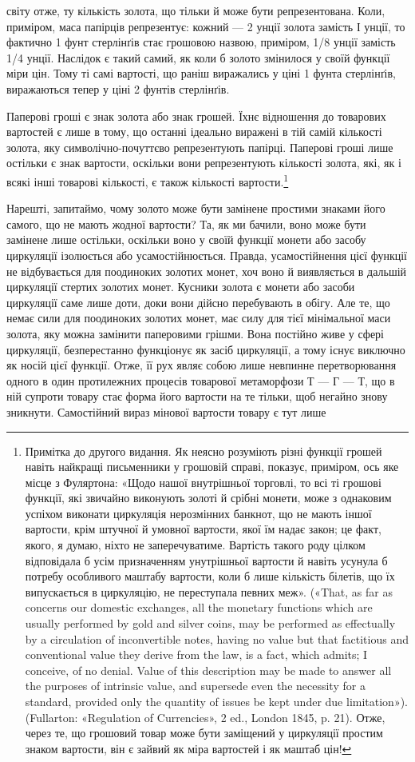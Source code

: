 світу отже, ту кількість золота, що тільки й може бути репрезентована.
Коли, приміром, маса папірців репрезентує: кожний —
2 унції золота замість І унції, то фактично 1 фунт стерлінґів
стає грошовою назвою, приміром, 1/8 унції замість 1/4 унції.
Наслідок є такий самий, як коли б золото змінилося у своїй
функції міри цін. Тому ті самі вартості, що раніш виражались
у ціні 1 фунта стерлінґів, виражаються тепер у ціні 2 фунтів
стерлінґів.

Паперові гроші є знак золота або знак грошей. Їхнє відношення
до товарових вартостей є лише в тому, що останні ідеально виражені
в тій самій кількості золота, яку символічно-почуттєво
репрезентують папірці. Паперові гроші лише остільки є знак
вартости, оскільки вони репрезентують кількості золота, які,
як і всякі інші товарові кількості, є також кількості вартости.\footnote{
Примітка до другого видання. Як неясно розуміють різні функції
грошей навіть найкращі письменники у грошовій справі, показує, приміром,
ось яке місце з Фуляртона: «Щодо нашої внутрішньої торговлі, то
всі ті грошові функції, які звичайно виконують золоті й срібні монети,
може з однаковим успіхом виконати циркуляція нерозмінних банкнот,
що не мають іншої вартости, крім штучної й умовної вартости, якої їм
надає закон; це факт, якого, я думаю, ніхто не заперечуватиме. Вартість
такого роду цілком відповідала б усім призначенням унутрішньої вартости
й навіть усунула б потребу особливого маштабу вартости, коли б лише
кількість білетів, що їх випускається в циркуляцію, не переступала
певних меж». («That, as far as concerns our domestic exchanges, all the
monetary functions which are usually performed by gold and silver coins,
may be performed as effectually by a circulation of inconvertible notes,
having no value but that factitious and conventional value they derive
from the law, is a fact, which admits; I conceive, of no denial. Value of
this description may be made to answer all the purposes of intrinsic value,
and supersede even the necessity for a standard, provided only the quantity
of issues be kept under due limitation»). (Fullarton: «Regulation of
Currencies», 2 ed., London 1845, p. 21). Отже, через те, що грошовий
товар може бути заміщений у циркуляції простим знаком вартости, він
є зайвий як міра вартостей і як маштаб цін!
}

Нарешті, запитаймо, чому золото може бути замінене простими
знаками його самого, що не мають жодної вартости? Та, як ми
бачили, воно може бути замінене лише остільки, оскільки воно
у своїй функції монети або засобу циркуляції ізолюється або
усамостійнюється. Правда, усамостійнення цієї функції не відбувається
для поодиноких золотих монет, хоч воно й виявляється
в дальшій циркуляції стертих золотих монет. Кусники золота
є монети або засоби циркуляції саме лише доти, доки вони дійсно
перебувають в обігу. Але те, що немає сили для поодиноких золотих
монет, має силу для тієї мінімальної маси золота, яку можна
замінити паперовими грішми. Вона постійно живе у сфері циркуляції,
безперестанно функціонує як засіб циркуляції, а тому
існує виключно як носій цієї функції. Отже, її рух являє собою
лише невпинне перетворювання одного в один протилежних процесів
товарової метаморфози Т — Г — Т, що в ній супроти товару
стає форма його вартости на те тільки, щоб негайно знову зникнути.
Самостійний вираз мінової вартости товару є тут лише